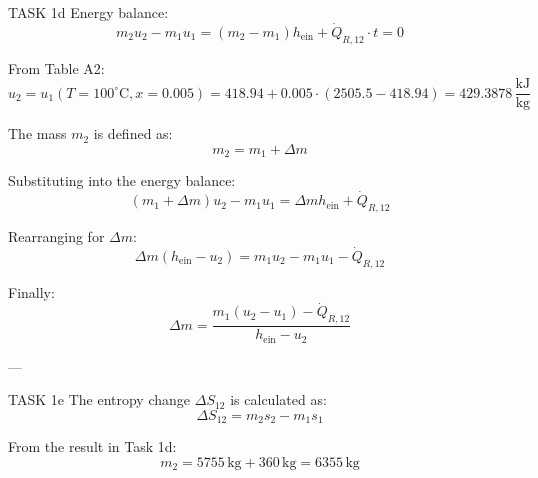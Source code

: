 TASK 1d  
Energy balance:  
\[
m_2 u_2 - m_1 u_1 = (m_2 - m_1) h_{\text{ein}} + \dot{Q}_{R,12} \cdot t = 0
\]

From Table A2:  
\[
u_2 = u_1 (T = 100^\circ\text{C}, x = 0.005) = 418.94 + 0.005 \cdot (2505.5 - 418.94) = 429.3878 \, \frac{\text{kJ}}{\text{kg}}
\]

The mass \( m_2 \) is defined as:  
\[
m_2 = m_1 + \Delta m
\]

Substituting into the energy balance:  
\[
(m_1 + \Delta m) u_2 - m_1 u_1 = \Delta m h_{\text{ein}} + \dot{Q}_{R,12}
\]

Rearranging for \( \Delta m \):  
\[
\Delta m (h_{\text{ein}} - u_2) = m_1 u_2 - m_1 u_1 - \dot{Q}_{R,12}
\]

Finally:  
\[
\Delta m = \frac{m_1 (u_2 - u_1) - \dot{Q}_{R,12}}{h_{\text{ein}} - u_2}
\]

---

TASK 1e  
The entropy change \( \Delta S_{12} \) is calculated as:  
\[
\Delta S_{12} = m_2 s_2 - m_1 s_1
\]

From the result in Task 1d:  
\[
m_2 = 5755 \, \text{kg} + 360 \, \text{kg} = 6355 \, \text{kg}
\]